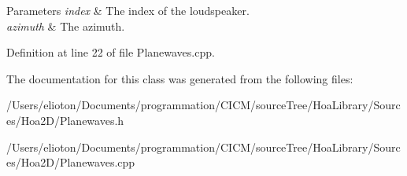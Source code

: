 \begin{DoxyParams}{Parameters}
{\em index} & The index of the loudspeaker. \\
\hline
{\em azimuth} & The azimuth. \\
\hline
\end{DoxyParams}


Definition at line 22 of file Planewaves.\-cpp.



The documentation for this class was generated from the following files\-:\begin{DoxyCompactItemize}
\item 
/\-Users/elioton/\-Documents/programmation/\-C\-I\-C\-M/source\-Tree/\-Hoa\-Library/\-Sources/\-Hoa2\-D/Planewaves.\-h\item 
/\-Users/elioton/\-Documents/programmation/\-C\-I\-C\-M/source\-Tree/\-Hoa\-Library/\-Sources/\-Hoa2\-D/Planewaves.\-cpp\end{DoxyCompactItemize}
